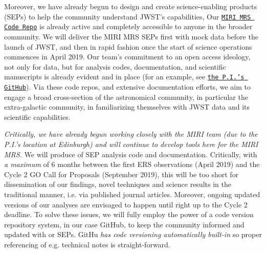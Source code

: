 \smallskip \smallskip
\noindent
Moreover, we have already begun to design and create science-enabling
products (SEPs) to help the community understand JWST's capabilities,
Our \href{https://github.com/miri-mrs}{{\tt MIRI MRS Code Repo}} is
already active and completely accessible to anyone in the broader
community.  We will deliver the MIRI MRS SEPs first with mock data
before the launch of JWST, and then in rapid fashion once the start of
science operations commences in April 2019.
Our team's commitment to an open access ideology, not only for data,
but for analysis codes, documentation, and scientific manuscripts is
already evident and in place (for an example, see
\href{https://github.com/d80b2t}{{\tt the P.I.'s GitHub}}).  Via these
code repos, and extensive documentation efforts, we aim to engage a
broad cross-section of the astronomical community, in particular the
extra-galactic community, in familiarizing themselves with JWST data
and its scientific capabilities.


\noindent
{\it Critically, we have already begun working closely with the MIRI
team (due to the P.I.'s location at Edinburgh) and will continue to
develop tools here for the MIRI MRS.}
We will produce of SEP analysis code and documentation.  Critically,
with {\it a maximum} of 6 months between the first ERS observations
(April 2019) and the Cycle 2 GO Call for Proposals (September 2019),
this will be too short for dissemination of our findings, novel
techniques and science results in the traditional manner, i.e. via
published journal articles. Moreover, ongoing updated versions of our
analyses are envisaged to happen until right up to the Cycle 2
deadline.  To solve these issues, we will fully employ the power of a
code version repository system, in our case GitHub, to keep the
community informed and updated with or SEPs. GitHu {\it has code
versioning automatically built-in} so proper referencing of
e.g. technical notes is straight-forward.






